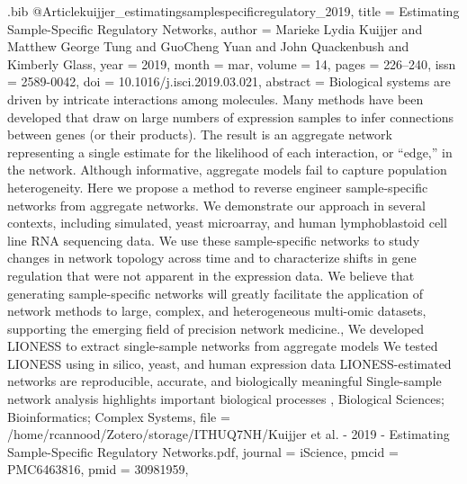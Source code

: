 \documentclass[
  table,
  10pt,
  a4paper]{article}
\begin{document}
\begin{filecontents}{\jobname.bib}
@Article{kuijjer_estimatingsamplespecificregulatory_2019,
	title = {Estimating {{Sample}}-{{Specific Regulatory Networks}}},
	author = {Marieke Lydia Kuijjer and Matthew George Tung and GuoCheng Yuan and John Quackenbush and Kimberly Glass},
	year = {2019},
	month = {mar},
	volume = {14},
	pages = {226--240},
	issn = {2589-0042},
	doi = {10.1016/j.isci.2019.03.021},
	abstract = {Biological systems are driven by intricate interactions among molecules. Many methods have been developed that draw on large numbers of expression samples to infer connections between genes (or their products). The result is an aggregate network representing a single estimate for the likelihood of each interaction, or ``edge,'' in the network. Although informative, aggregate models fail to capture population heterogeneity. Here we propose a method to reverse engineer sample-specific networks from aggregate networks. We demonstrate our approach in several contexts, including simulated, yeast microarray, and human lymphoblastoid cell line RNA sequencing data. We use these sample-specific networks to study changes in network topology across time and to characterize shifts in gene regulation that were not apparent in the expression data. We believe that generating sample-specific networks will greatly facilitate the application of network methods to large, complex, and heterogeneous multi-omic datasets, supporting the emerging field of precision network medicine.,                                        \textbullet{}               We developed LIONESS to extract single-sample networks from aggregate models                                         \textbullet{}               We tested LIONESS using in silico, yeast, and human expression data                                         \textbullet{}               LIONESS-estimated networks are reproducible, accurate, and biologically meaningful                                         \textbullet{}               Single-sample network analysis highlights important biological processes                                 , Biological Sciences; Bioinformatics; Complex Systems},
	file = {/home/rcannood/Zotero/storage/ITHUQ7NH/Kuijjer et al. - 2019 - Estimating Sample-Specific Regulatory Networks.pdf},
	journal = {iScience},
	pmcid = {PMC6463816},
	pmid = {30981959},
}


\end{filecontents}
\end{document}
